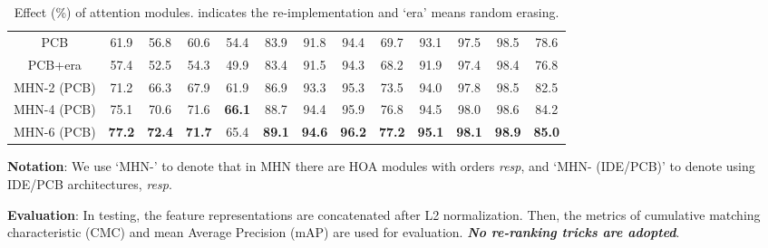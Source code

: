 \documentclass[10pt,twocolumn,letterpaper]{article}
\begin{document}
\begin{table*}[htbp]
{\begin{tabular}{c|cc|cc|cccc|cccc}
    \hline
    PCB \cite{sun2018beyond}   &  61.9  & 56.8  & 60.6  & 54.4    &   83.9  & 91.8  & 94.4  & 69.7   &  93.1 & 97.5 & 98.5 & 78.6 \\
    PCB+era &  57.4   &  52.5   &  54.3  &   49.9  &   83.4  &  91.5   &  94.3   &  68.2   &  91.9  &   97.4  &   98.4  & 76.8\\
    MHN-2 (PCB) &  71.2   &  66.3   &  67.9  &   61.9  &   86.9  &  93.3   &  95.3   &  73.5   &  94.0  &   97.8  &   98.5  & 82.5\\
    MHN-4 (PCB) &   75.1  &  70.6   &   71.6  &   \textbf{66.1}  &  88.7   &  94.4   &  95.9   &   76.8  &  94.5   &  98.0   &  98.6   & 84.2 \\
    MHN-6 (PCB) &  \textbf{77.2}  & \textbf{72.4} & \textbf{71.7}  & 65.4  &   \textbf{89.1}  & \textbf{94.6}& \textbf{96.2}  & \textbf{77.2}    &  \textbf{95.1}  & \textbf{98.1}  & \textbf{98.9}  & \textbf{85.0}  \\
    \hline
    \end{tabular}}
    \vspace{0.1em}
      \caption{Effect (\%) of attention modules.  indicates the re-implementation and `era' means random erasing.}
      \vspace{-1em}
  \label{tab_mhn}\end{table*}\textbf{Notation}: We use `MHN-' to denote that in MHN there are  HOA modules with orders  \emph{resp}, and `MHN- (IDE/PCB)' to denote using IDE/PCB architectures, \emph{resp}.

\textbf{Evaluation}: In testing, the feature representations  are concatenated after L2 normalization. Then, the metrics of cumulative matching characteristic (CMC) and mean Average Precision (mAP) are used for evaluation. \textbf{\emph{No re-ranking tricks are adopted}}.\vspace{-0.6em}
\end{document}
